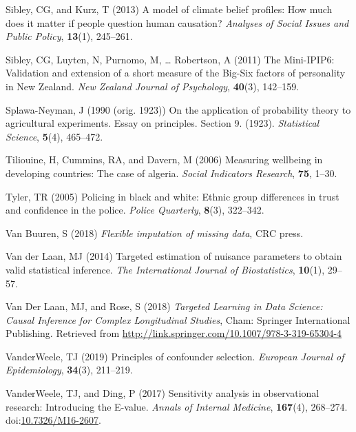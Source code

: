 \documentclass[
  single column]{article}
\newlength{\cslhangindent}
\newenvironment{CSLReferences}[2] %
 {\begin{list}{}{%
  \setlength{\itemindent}{0pt}
  \setlength{\leftmargin}{0pt}
  \setlength{\parsep}{0pt}
  \ifodd #1
   \setlength{\leftmargin}{\cslhangindent}
   \setlength{\itemindent}{-1\cslhangindent}
  \fi
  \setlength{\itemsep}{#2\baselineskip}}}
 {\end{list}}
\begin{document}
\begin{CSLReferences}{1}{0}
Sibley, CG, and Kurz, T (2013) A model of climate belief profiles: How
much does it matter if people question human causation? \emph{Analyses
of Social Issues and Public Policy}, \textbf{13}(1), 245--261.

Sibley, CG, Luyten, N, Purnomo, M, \ldots{} Robertson, A (2011) The
Mini-IPIP6: Validation and extension of a short measure of the Big-Six
factors of personality in {N}ew {Z}ealand. \emph{New Zealand Journal of
Psychology}, \textbf{40}(3), 142--159.

Splawa-Neyman, J (1990 (orig. 1923)) On the application of probability
theory to agricultural experiments. Essay on principles. Section 9.
(1923). \emph{Statistical Science}, \textbf{5}(4), 465--472.

Tiliouine, H, Cummins, RA, and Davern, M (2006) Measuring wellbeing in
developing countries: The case of algeria. \emph{Social Indicators
Research}, \textbf{75}, 1--30.

Tyler, TR (2005) Policing in black and white: Ethnic group differences
in trust and confidence in the police. \emph{Police Quarterly},
\textbf{8}(3), 322--342.

Van Buuren, S (2018) \emph{Flexible imputation of missing data}, CRC
press.

Van der Laan, MJ (2014) Targeted estimation of nuisance parameters to
obtain valid statistical inference. \emph{The International Journal of
Biostatistics}, \textbf{10}(1), 29--57.

Van Der Laan, MJ, and Rose, S (2018) \emph{Targeted Learning in Data
Science: Causal Inference for Complex Longitudinal Studies}, Cham:
Springer International Publishing. Retrieved from
\url{http://link.springer.com/10.1007/978-3-319-65304-4}

VanderWeele, TJ (2019) Principles of confounder selection.
\emph{European Journal of Epidemiology}, \textbf{34}(3), 211--219.

VanderWeele, TJ, and Ding, P (2017) Sensitivity analysis in
observational research: Introducing the {E}-value. \emph{Annals of
Internal Medicine}, \textbf{167}(4), 268--274.
doi:\href{https://doi.org/10.7326/M16-2607}{10.7326/M16-2607}.


\end{CSLReferences}
\end{document}
